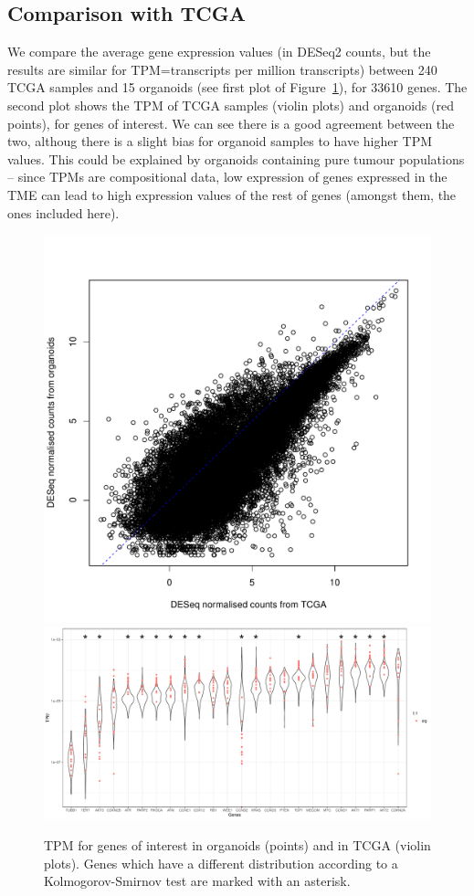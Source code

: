 \documentclass{article}
\begin{document}
\clearpage
\subsection{Comparison with TCGA}

We compare the average gene expression values (in DESeq2 counts, but the results are similar for TPM=transcripts per million transcripts) between 240 TCGA samples and 15 organoids (see first plot of Figure~\ref{tcga_org_cor_rnaseq}), for 33610 genes. The second plot shows the TPM of TCGA samples (violin plots) and organoids (red points), for genes of interest. We can see there is a good agreement between the two, althoug there is a slight bias for organoid samples to have higher TPM values. This could be explained by  organoids containing pure tumour populations -- since TPMs are compositional data, low expression of genes expressed in the TME can lead to high expression values of the rest of genes (amongst them, the ones included here).

\begin{figure}[h]
\centering
\includegraphics[width=.42\textwidth]{../../RNASeq_DE_resistant_sensitive/figures/Sensitive_resistant_figures/colmeans_deseqcounts_correlation_tcga_org.pdf}
\includegraphics[width=\textwidth]{../../RNASeq_DE_resistant_sensitive/figures/Sensitive_resistant_figures/TPM_correlation_tcga_org_selected_genes.pdf}
\caption{TPM for genes of interest in organoids (points) and in TCGA (violin plots). Genes which have a different distribution according to a Kolmogorov-Smirnov test are marked with an asterisk.\label{tcga_org_cor_rnaseq}}
\end{figure}
\end{document}
